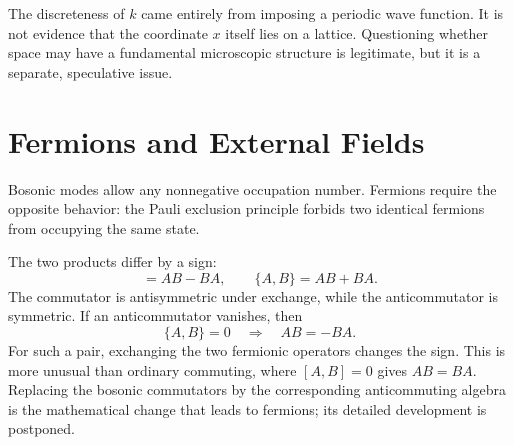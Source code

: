 \begin{classroomqa}
\end{classroomqa}


The discreteness of \(k\) came entirely from imposing a periodic wave function. It is not evidence that the coordinate \(x\) itself lies on a lattice. Questioning whether space may have a fundamental microscopic structure is legitimate, but it is a separate, speculative issue.

\section{Fermions and External Fields}

Bosonic modes allow any nonnegative occupation number. Fermions require the opposite behavior: the Pauli exclusion principle forbids two identical fermions from occupying the same state.

\begin{classroomqa}
\end{classroomqa}

The two products differ by a sign:
\begin{equation}
[A,B]=AB-BA,
\qquad
\{A,B\}=AB+BA.
\end{equation}
The commutator is antisymmetric under exchange, while the anticommutator is symmetric. If an anticommutator vanishes, then
\begin{equation}
\{A,B\}=0
\quad\Longrightarrow\quad
AB=-BA.
\end{equation}
For such a pair, exchanging the two fermionic operators changes the sign. This is more unusual than ordinary commuting, where \([A,B]=0\) gives \(AB=BA\). Replacing the bosonic commutators by the corresponding anticommuting algebra is the mathematical change that leads to fermions; its detailed development is postponed.

